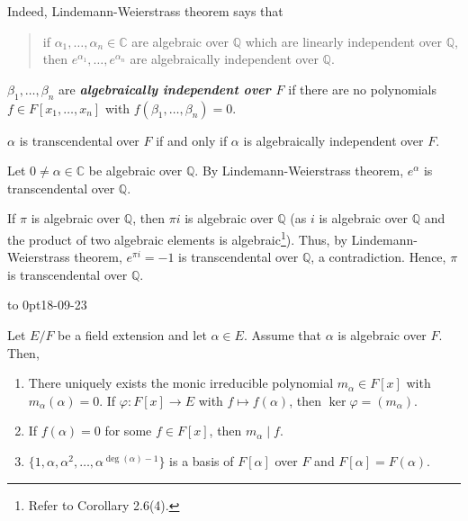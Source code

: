 \documentclass[twoside]{article}
\newcommand\Q{\mathbb Q}
\newcommand\R{\mathbb R}
\newcommand\C{\mathbb C}
\theoremstyle{remark}
\newcounter{theorem}
\newcommand*\term[1]{\textbf{\textit{\mathversion{bold}#1}}}
\newcommand*\newclass[1]{\par\vbox to 0pt{\hbox{\tiny\sffamily\color{gray}#1}} \par\ignorespaces}
\begin{document}
\begin{examples}
\end{examples}

Indeed, Lindemann-Weierstrass theorem says that
\begin{quote}
  if \(\alpha_1, \dots, \alpha_n \in \C\) are algebraic over \(\Q\) which are linearly independent over \(\Q\), then \(e^{\alpha_1}, \dots, e^{\alpha_n}\) are algebraically independent over \(\Q\).
\end{quote}
\(\beta_1, \dots, \beta_n\) are \term{algebraically independent over \(F\)} if there are no polynomials \(f \in F[x_1, \dots, x_n]\) with \(f(\beta_1, \dots, \beta_n) = 0\).

\(\alpha\) is transcendental over \(F\) if and only if \(\alpha\) is algebraically independent over \(F\).

Let \(0 \neq \alpha \in \C\) be algebraic over \(\Q\). By Lindemann-Weierstrass theorem, \(e^\alpha\) is transcendental over \(\Q\).

If \(\pi\) is algebraic over \(\Q\), then \(\pi i\) is algebraic over \(\Q\) (as \(i\) is algebraic over \(\Q\) and the product of two algebraic elements is algebraic\footnote{Refer to Corollary 2.6(4).}). Thus, by Lindemann-Weierstrass theorem, \(e^{\pi i} = -1\) is transcendental over \(\Q\), a contradiction. Hence, \(\pi\) is transcendental over \(\Q\).

\newclass{18-09-23}

\begin{theorem}
  Let \(E/F\) be a field extension and let \(\alpha \in E\). Assume that \(\alpha\) is algebraic over \(F\). Then,
  \begin{enumerate}[label=\textup{(\arabic*)}, nosep]
    \item There uniquely exists the monic irreducible polynomial \(m_\alpha \in F[x]\) with \(m_\alpha(\alpha) = 0\). If \(\varphi\colon F[x] \to E\) with \(f \mapsto f(\alpha)\), then \(\ker\varphi = (m_\alpha)\).
    \item If \(f(\alpha) = 0\) for some \(f \in F[x]\), then \(m_\alpha \mid f\).
    \item \(\{1, \alpha, \alpha^2, \dots, \alpha^{\deg(\alpha)-1}\}\) is a basis of \(F[\alpha]\) over \(F\) and \(F[\alpha] = F(\alpha)\).
  \end{enumerate}
\end{theorem}
\end{document}
